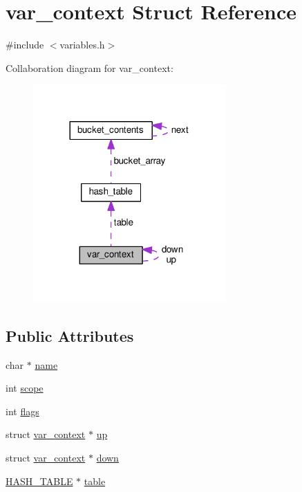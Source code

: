 \hypertarget{structvar__context}{}\section{var\+\_\+context Struct Reference}
\label{structvar__context}


{\ttfamily \#include $<$variables.\+h$>$}



Collaboration diagram for var\+\_\+context\+:
\nopagebreak
\begin{figure}[H]
\begin{center}
\leavevmode
\includegraphics[width=209pt]{structvar__context__coll__graph}
\end{center}
\end{figure}
\subsection*{Public Attributes}
\begin{DoxyCompactItemize}
\item 
char $\ast$ \hyperlink{structvar__context_adf16b336746df59643044d0688a4d593}{name}
\item 
int \hyperlink{structvar__context_a616bf2696f42da3a8d3f8342eaf936fb}{scope}
\item 
int \hyperlink{structvar__context_a9570eb7deb9d92355f507e437f7112c0}{flags}
\item 
struct \hyperlink{structvar__context}{var\+\_\+context} $\ast$ \hyperlink{structvar__context_a69daf990f55d7823ee3ee80ae9ae4b4a}{up}
\item 
struct \hyperlink{structvar__context}{var\+\_\+context} $\ast$ \hyperlink{structvar__context_aec918162dabf8df65cdb881279f43277}{down}
\item 
\hyperlink{hashlib_8h_a8284f9978df160609365484b829527e6}{H\+A\+S\+H\+\_\+\+T\+A\+B\+LE} $\ast$ \hyperlink{structvar__context_ae3392829999a8c3470675cd298d3eb73}{table}
\end{DoxyCompactItemize}


